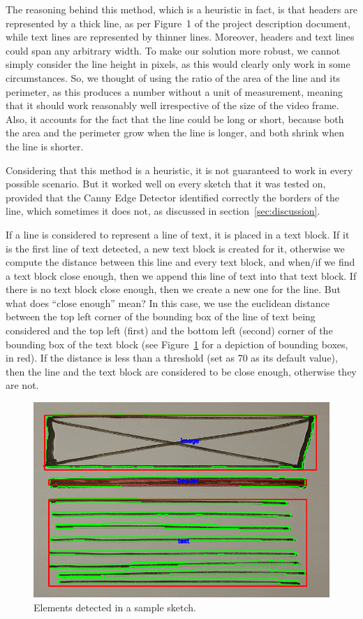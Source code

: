 \documentclass[]{IEEEtran}
\begin{document}
  The reasoning behind this method, which is a heuristic in fact, is that headers are represented by a thick line, as per Figure~1 of the project description document, while text lines are represented by thinner lines. Moreover, headers and text lines could span any arbitrary width. To make our solution more robust, we cannot simply consider the line height in pixels, as this would clearly only work in some circumstances. So, we thought of using the ratio of the area of the line and its perimeter, as this produces a number without a unit of measurement, meaning that it should work reasonably well irrespective of the size of the video frame. Also, it accounts for the fact that the line could be long or short, because both the area and the perimeter grow when the line is longer, and both shrink when the line is shorter.

  Considering that this method is a heuristic, it is not guaranteed to work in every possible scenario. But it worked well on every sketch that it was tested on, provided that the Canny Edge Detector identified correctly the borders of the line, which sometimes it does not, as discussed in section~\ref{sec:discussion}.

  If a line is considered to represent a line of text, it is placed in a text block. If it is the first line of text detected, a new text block is created for it, otherwise we compute the distance between this line and every text block, and when/if we find a text block close enough, then we append this line of text into that text block. If there is no text block close enough, then we create a new one for the line. But what does ``close enough'' mean? In this case, we use the euclidean distance between the top left corner of the bounding box of the line of text being considered and the top left (first) and the bottom left (second) corner of the bounding box of the text block (see Figure~\ref{fig:detection} for a depiction of bounding boxes, in red). If the distance is less than a threshold (set as 70 as its default value), then the line and the text block are considered to be close enough, otherwise they are not.

  \begin{figure}[h]
    \includegraphics[width=\linewidth]{./figures/detection.png}
    \caption{Elements detected in a sample sketch.}
    \label{fig:detection}
  \end{figure}
\end{document}
